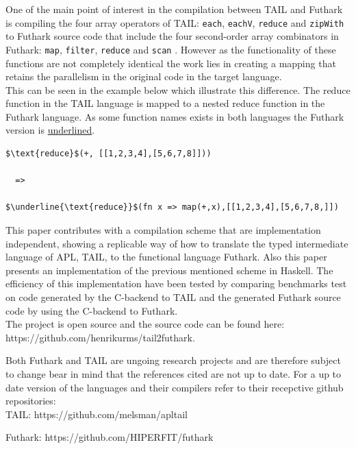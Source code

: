 \documentclass[11pt]{article}
\begin{document}
One of the main point of interest in the compilation between TAIL and Futhark is compiling the four array operators 
of TAIL: {\tt each}, {\tt eachV}, 
 {\tt reduce} and {\tt zipWith} to Futhark source code that include the four second-order array combinators in Futhark:  
 {\tt map}, {\tt filter}, {\tt reduce} and {\tt scan} \cite{ElsmanDybdal:Array:2014}\cite{TroelsHenriksen}. 
However as the functionality of these functions are not completely 
identical the work lies in creating a mapping that retains the parallelism in the original code in the target language.\\
This can be seen in the example below which illustrate this difference. The reduce function in the
TAIL language is mapped to a nested reduce function in the Futhark language.
As some function names exists in both languages the Futhark version is \underline{underlined}.

\begin{lstlisting}[numbers=none,frame=none]
$\text{reduce}$(+, [[1,2,3,4],[5,6,7,8]]))

  =>

$\underline{\text{reduce}}$(fn x => map(+,x),[[1,2,3,4],[5,6,7,8,]])

\end{lstlisting}

This paper contributes with a compilation scheme that are implementation independent, showing a replicable 
way of how to translate the typed intermediate language of APL, TAIL, to the functional language Futhark. Also 
this paper presents an implementation of the previous mentioned scheme in Haskell. The efficiency of this
 implementation have been tested by comparing benchmarks test on code generated by the C-backend to TAIL 
 and the generated Futhark source code by using the C-backend to Futhark. \\

The project is open source and the source code can be found here:\\ https://github.com/henrikurms/tail2futhark.

Both Futhark and TAIL are ungoing research projects and are therefore subject to change bear in mind that the references cited are not up to date. For a up to date version of the languages and their compilers refer to their recepctive github repositories: \\

TAIL: https://github.com/melsman/apltail

Futhark: https://github.com/HIPERFIT/futhark
\end{document}
